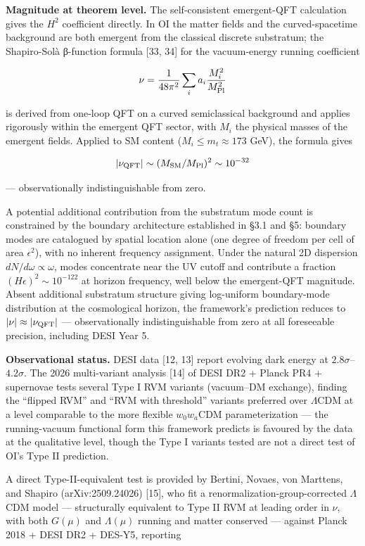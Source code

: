\documentclass[
]{article}
\begin{document}
\textbf{Magnitude at theorem level.} The self-consistent emergent-QFT
calculation gives the \(H^2\) coefficient directly. In OI the matter
fields and the curved-spacetime background are both emergent from the
classical discrete substratum; the Shapiro-Solà β-function formula
{[}33, 34{]} for the vacuum-energy running coefficient

\[\nu = \frac{1}{48\pi^2}\sum_i a_i \frac{M_i^2}{M_{\rm Pl}^2}\]

is derived from one-loop QFT on a curved semiclassical background and
applies rigorously within the emergent QFT sector, with \(M_i\) the
physical masses of the emergent fields. Applied to SM content
(\(M_i \leq m_t \approx 173\) GeV), the formula gives

\[|\nu_{\rm QFT}| \sim (M_{\rm SM}/M_{\rm Pl})^2 \sim 10^{-32}\]

--- observationally indistinguishable from zero.

A potential additional contribution from the substratum mode count is
constrained by the boundary architecture established in §3.1 and §5:
boundary modes are catalogued by spatial location alone (one degree of
freedom per cell of area \(\epsilon^2\)), with no inherent frequency
assignment. Under the natural 2D dispersion
\(dN/d\omega \propto \omega\), modes concentrate near the UV cutoff and
contribute a fraction \((H\epsilon)^2 \sim 10^{-122}\) at horizon
frequency, well below the emergent-QFT magnitude. Absent additional
substratum structure giving log-uniform boundary-mode distribution at
the cosmological horizon, the framework's prediction reduces to
\(|\nu| \approx |\nu_{\rm QFT}|\) --- observationally indistinguishable
from zero at all foreseeable precision, including DESI Year 5.

\textbf{Observational status.} DESI data {[}12, 13{]} report evolving
dark energy at \(2.8\sigma\)--\(4.2\sigma\). The 2026 multi-variant
analysis {[}14{]} of DESI DR2 + Planck PR4 + supernovae tests several
Type I RVM variants (vacuum--DM exchange), finding the ``flipped RVM''
and ``RVM with threshold'' variants preferred over \(\Lambda\)CDM at a
level comparable to the more flexible \(w_0w_a\)CDM parameterization ---
the running-vacuum functional form this framework predicts is favoured
by the data at the qualitative level, though the Type I variants tested
are not a direct test of OI's Type II prediction.

A direct Type-II-equivalent test is provided by Bertini, Novaes, von
Marttens, and Shapiro (arXiv:2509.24026) {[}15{]}, who fit a
renormalization-group-corrected \(\Lambda\)CDM model --- structurally
equivalent to Type II RVM at leading order in \(\nu\), with both
\(G(\mu)\) and \(\Lambda(\mu)\) running and matter conserved --- against
Planck 2018 + DESI DR2 + DES-Y5, reporting
\end{document}
